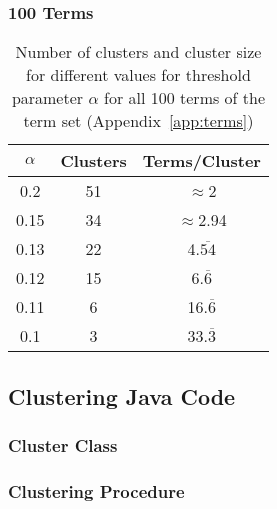 \subsubsection{100 Terms}
\label{app:alpha_100terms}
\begin{table}[h]
    \centering
    \begin{tabular}{|c|c|c|}
        \hline
        $\alpha$ & Clusters & Terms/Cluster  \\
        \hline
        0.2 & 51 & $\approx$2 \\
        0.15 & 34 & $\approx$2.94 \\
        0.13 & 22 & 4.$\overline{54}$ \\
        0.12 & 15 & 6.$\overline{6}$ \\
        0.11 & 6 & 16.$\overline{6}$ \\
        0.1 & 3 & 33.$\overline{3}$ \\
        \hline
    \end{tabular}
    \caption{Number of clusters and cluster size for different values for threshold parameter $\alpha$ for all 100 terms of the term set
            (Appendix~\ref{app:terms})}
    \label{tab:app_100terms}
\end{table}


\newpage
\subsection{Clustering Java Code}
\label{app:java}

\subsubsection{Cluster Class}
\label{app:java_cluster}



\subsubsection{Clustering Procedure}
\label{app:java_clustering}

